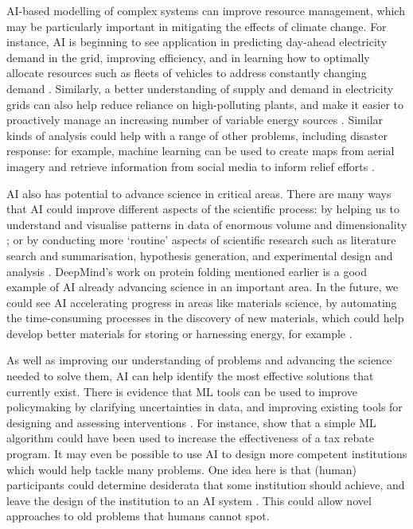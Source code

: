 \documentclass{article}
\begin{document}
AI-based modelling of complex systems can improve resource management, which may be particularly important in mitigating the effects of climate change. For instance, AI is beginning to see application in predicting day-ahead electricity demand in the grid, improving efficiency, and in learning how to optimally allocate resources such as fleets of vehicles to address constantly changing demand \citep{hogarth_state_2019}. Similarly, a better understanding of supply and demand in electricity grids can also help reduce reliance on high-polluting plants, and make it easier to proactively manage an increasing number of variable energy sources \citep{rolnick_tackling_2019}. Similar kinds of analysis could help with a range of other problems, including disaster response: for example, machine learning can be used to create maps from aerial imagery and retrieve information from social media to inform relief efforts  \citep{rolnick_tackling_2019}.

AI also has potential to advance science in critical areas. There are many ways that AI could improve different aspects of the scientific process: by helping us to understand and visualise patterns in data of enormous volume and dimensionality \citep{mjolsness_machine_2001,ourmazd_science_2020}; or by conducting more ‘routine’ aspects of scientific research such as literature search and summarisation, hypothesis generation, and experimental design and analysis \citep{gil_amplify_2014}. DeepMind’s work on protein folding mentioned earlier is a good example of AI already advancing science in an important area. In the future, we could see AI accelerating progress in areas like materials science, by automating the time-consuming processes in the discovery of new materials, which could help develop better materials for storing or harnessing energy, for example \citep{rolnick_tackling_2019}.

As well as improving our understanding of problems and advancing the science needed to solve them, AI can help identify the most effective solutions that currently exist. There is evidence that ML tools can be used to improve policymaking by clarifying uncertainties in data, and improving existing tools for designing and assessing interventions  \citep{rolnick_tackling_2019}. For instance, \citet{andini_targeting_2018} show that a simple ML algorithm could have been used to increase the effectiveness of a tax rebate program. It may even be possible to use AI to design more competent institutions which would help tackle many problems. One idea here is that (human) participants could determine desiderata that some institution should achieve, and leave the design of the institution to an AI system \citep{dafoe_open_2020}. This could allow novel approaches to old problems that humans cannot spot.
\end{document}
